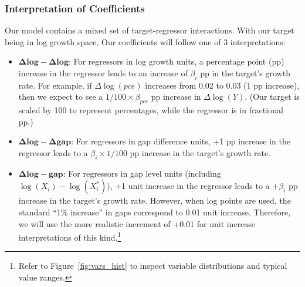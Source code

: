 \subsubsection{Interpretation of Coefficients}\label{subsubsec:coef_interpretation}
Our model contains a mixed set of target-regressor interactions. With our target being in log growth space,
Our coefficients will follow one of 3 interpretations: 
\begin{itemize}
    \item $\mathbf{\Delta log - \Delta log}$: For regressors in log growth units, a percentage point (pp) increase in the regressor leads to an increase of $\beta_i$ pp in the target's growth rate.
    For example, if $\Delta \log(pce)$ increases from 0.02 to 0.03 (1 pp increase), then we expect to see a $1/100 \times \beta_{pce}$ pp increase in $\Delta \log(Y)$. (Our target is scaled by 100 to represent percentages, while the regressor is in fractional pp.)
    \item $\mathbf{\Delta log - \Delta gap}$: For regressors in gap difference units, +1 pp increase in the regressor leads to a $\beta_i \times 1/100$ pp increase in the target's growth rate.
    \item $\mathbf{\Delta log - gap}$: For regressors in gap level units (including $\log(X_i) - \log(X^*_i)$), +1 unit increase in the regressor leads to a $+\beta_i$ pp increase in the target's growth rate. However, when log points are used, the standard \enquote{1\% increase} in gaps correspond to 0.01 unit increase.
    Therefore, we will use the more realistic increment of +0.01 for unit increase interpretations of this kind.\footnote{Refer to Figure~\ref{fig:vars_hist} to inspect variable distributions and typical value ranges.}
\end{itemize}

